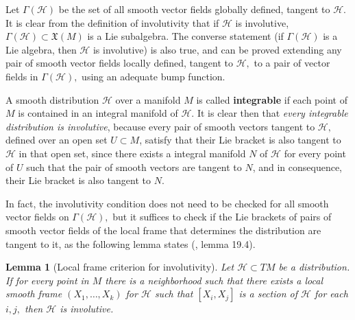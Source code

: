 \documentclass[12pt, letterpaper, reqno]{amsart}
\theoremstyle{definition}
\theoremstyle{plain}
\newtheorem{lm}{Lemma}
\theoremstyle{remark}
\begin{document}
Let $ \Gamma(\mathcal{H}) $ be the set of all smooth vector fields globally defined, tangent to $ \mathcal{H}. $ It is clear from the definition of involutivity that if $ \mathcal{H} $ is involutive, $ \Gamma (\mathcal{H})\subset \mathfrak{X}(M) $ is a Lie subalgebra. The converse statement (if $ \Gamma(\mathcal{H}) $ is a Lie algebra, then $ \mathcal{H} $ is involutive) is also true, and can be proved extending any pair of smooth vector fields locally defined, tangent to $ \mathcal{H} ,$ to a pair of vector fields in $ \Gamma( \mathcal{H}), $ using an adequate bump function. 

A smooth distribution $ \mathcal{H} $ over a manifold $ M $ is called \textbf{integrable} if each point of $ M $ is contained in an integral manifold of $ \mathcal{H}. $  It is clear then that \textit{every integrable distribution is involutive}, because every pair of smooth vectors tangent to $ \mathcal{H}, $ defined over an open set $ U\subset M $, satisfy that their Lie bracket is also tangent to $ \mathcal{H} $ in that open set, since there exists a integral manifold $ N $  of $ \mathcal{H} $ for every point of $ U $ such that the pair of smooth vectors are tangent to $ N $, and in consequence, their Lie bracket is also tangent to $ N. $  

In fact, the involutivity condition does not need to be checked for all smooth vector fields on $ \Gamma( \mathcal{H}), $ but it suffices to check if the Lie brackets of pairs of smooth vector fields of the local frame that determines the distribution are tangent to it, as the following lemma states (\cite{lee2003introduction}, lemma 19.4).

\begin{lm}[Local frame criterion for involutivity] 
	Let $ \mathcal{H}\subset TM $ be a distribution. If for every point in $ M $ there is a neighborhood such that there exists a local smooth frame $ (X_1,\dots, X_k) $ for $ \mathcal{H} $ such that $ [X_i,X_j] $ is a section of $ \mathcal{H} $ for each $ i,j, $ then $ \mathcal{H} $ is involutive.
\end{lm}
\end{document}
